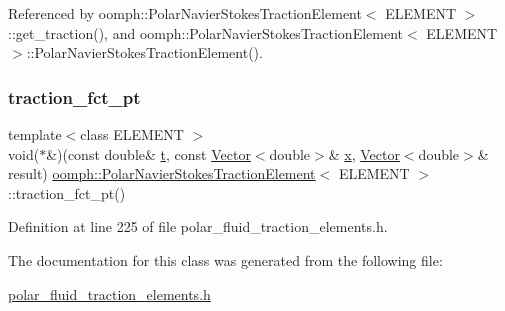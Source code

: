 Referenced by oomph\+::\+Polar\+Navier\+Stokes\+Traction\+Element$<$ E\+L\+E\+M\+E\+N\+T $>$\+::get\+\_\+traction(), and oomph\+::\+Polar\+Navier\+Stokes\+Traction\+Element$<$ E\+L\+E\+M\+E\+N\+T $>$\+::\+Polar\+Navier\+Stokes\+Traction\+Element().

\mbox{\label{classoomph_1_1PolarNavierStokesTractionElement_a4d05f1d3a021af63ff7c99b78cd24e58}} 
\subsubsection{\texorpdfstring{traction\+\_\+fct\+\_\+pt}{traction\_fct\_pt}}
{\footnotesize\ttfamily template$<$class E\+L\+E\+M\+E\+NT $>$ \\
void($\ast$\&)(const double\& \hyperlink{cfortran_8h_af6f0bd3dc13317f895c91323c25c2b8f}{t}, const \hyperlink{classoomph_1_1Vector}{Vector}$<$double$>$\& \hyperlink{classoomph_1_1PolarNavierStokesTractionElement_a9c89a9bed61686e2fb60717f133f8f02}{x}, \hyperlink{classoomph_1_1Vector}{Vector}$<$double$>$\& result) \hyperlink{classoomph_1_1PolarNavierStokesTractionElement}{oomph\+::\+Polar\+Navier\+Stokes\+Traction\+Element}$<$ E\+L\+E\+M\+E\+NT $>$\+::traction\+\_\+fct\+\_\+pt()\hspace{0.3cm}{\ttfamily [inline]}}



Definition at line 225 of file polar\+\_\+fluid\+\_\+traction\+\_\+elements.\+h.



The documentation for this class was generated from the following file\+:\begin{DoxyCompactItemize}
\item 
\hyperlink{polar__fluid__traction__elements_8h}{polar\+\_\+fluid\+\_\+traction\+\_\+elements.\+h}\end{DoxyCompactItemize}
